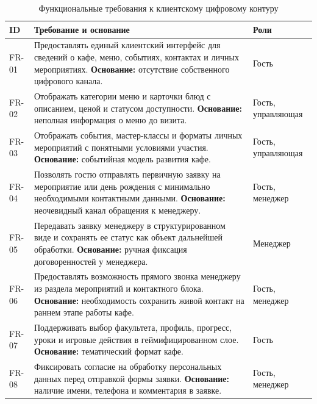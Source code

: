 \begin{table}[H]
\centering
\footnotesize
\caption{Функциональные требования к клиентскому цифровому контуру}
\label{tab:ch3_functional_requirements}
\setlength{\tabcolsep}{4pt}
\begin{tabularx}{\textwidth}{|>{\raggedright\arraybackslash}p{}|>{\raggedright\arraybackslash}p{}|>{\raggedright\arraybackslash}X|}
\hline
\textbf{ID} & \textbf{Требование и основание} & \textbf{Роли} \\ \hline
FR-01 & Предоставлять единый клиентский интерфейс для сведений о кафе, меню, событиях, контактах и личных мероприятиях. \newline \textbf{Основание:} отсутствие собственного цифрового канала. & Гость \\ \hline
FR-02 & Отображать категории меню и карточки блюд с описанием, ценой и статусом доступности. \newline \textbf{Основание:} неполная информация о меню до визита. & Гость, управляющая \\ \hline
FR-03 & Отображать события, мастер-классы и форматы личных мероприятий с понятными условиями участия. \newline \textbf{Основание:} событийная модель развития кафе. & Гость, управляющая \\ \hline
FR-04 & Позволять гостю отправлять первичную заявку на мероприятие или день рождения с минимально необходимыми контактными данными. \newline \textbf{Основание:} неочевидный канал обращения к менеджеру. & Гость, менеджер \\ \hline
FR-05 & Передавать заявку менеджеру в структурированном виде и сохранять ее статус как объект дальнейшей обработки. \newline \textbf{Основание:} ручная фиксация договоренностей у менеджера. & Менеджер \\ \hline
FR-06 & Предоставлять возможность прямого звонка менеджеру из раздела мероприятий и контактного блока. \newline \textbf{Основание:} необходимость сохранить живой контакт на раннем этапе работы кафе. & Гость, менеджер \\ \hline
FR-07 & Поддерживать выбор факультета, профиль, прогресс, уроки и игровые действия в геймифицированном слое. \newline \textbf{Основание:} тематический формат кафе. & Гость \\ \hline
FR-08 & Фиксировать согласие на обработку персональных данных перед отправкой формы заявки. \newline \textbf{Основание:} наличие имени, телефона и комментария в заявке. & Гость, менеджер \\ \hline

\end{tabularx}
\end{table}
